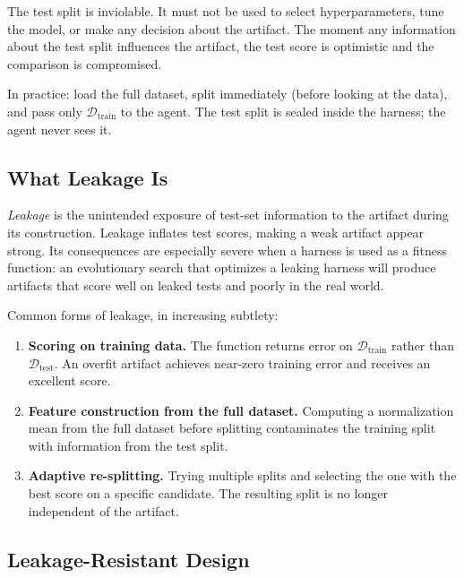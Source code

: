 \begin{principle}
\label{principle:TestSplitInviolable}
The test split is inviolable.
It must not be used to select hyperparameters, tune the model, or make any decision about the artifact.
The moment any information about the test split influences the artifact, the test score is optimistic and the comparison is compromised.
\end{principle}

In practice: load the full dataset, split immediately (before looking at the data), and pass only $\mathcal{D}_{\mathrm{train}}$ to the agent.
The test split is sealed inside the harness; the agent never sees it.

\subsection{What Leakage Is}

\emph{Leakage} is the unintended exposure of test-set information to the artifact during its construction.
Leakage inflates test scores, making a weak artifact appear strong.
Its consequences are especially severe when a harness is used as a fitness function: an evolutionary search that optimizes a leaking harness will produce artifacts that score well on leaked tests and poorly in the real world.

\begin{example}
Common forms of leakage, in increasing subtlety:
\begin{enumerate}
\item \textbf{Scoring on training data.} The function returns error on $\mathcal{D}_{\mathrm{train}}$ rather than $\mathcal{D}_{\mathrm{test}}$.
An overfit artifact achieves near-zero training error and receives an excellent score.
\item \textbf{Feature construction from the full dataset.} Computing a normalization mean from the full dataset before splitting contaminates the training split with information from the test split.
\item \textbf{Adaptive re-splitting.} Trying multiple splits and selecting the one with the best score on a specific candidate.
The resulting split is no longer independent of the artifact.
\end{enumerate}
\end{example}

\subsection{Leakage-Resistant Design}

